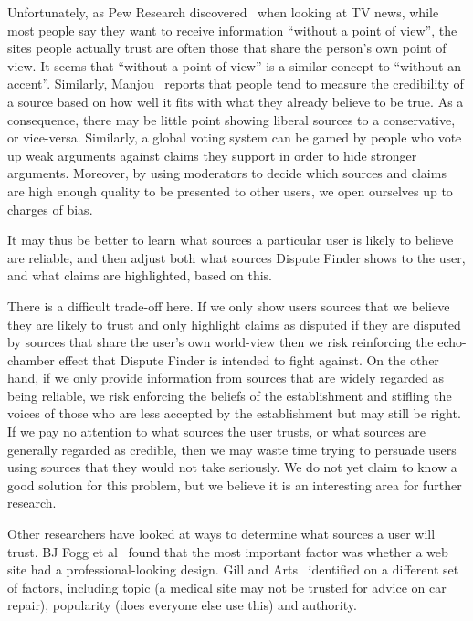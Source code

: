 \documentclass{www2010-submission}
\newcommand{\todo}[1]{}
\begin{document}
Unfortunately, as Pew Research discovered~\cite{PewResearch2008} when looking at TV news, while most people say they want to receive information ``without a point of view'', the sites people actually trust are often those that share the person's own point of view. It seems that ``without a point of view'' is a similar concept to ``without an accent''. Similarly, Manjou~\cite{Manjou2008} reports that people tend to measure the credibility of a source based on how well it fits with what they already believe to be true.  As a consequence, there may be little point showing liberal sources to a conservative, or vice-versa. Similarly, a global voting system can be gamed by people who vote up weak arguments against claims they support in order to hide stronger arguments. Moreover, by using moderators to decide which sources and claims are high enough quality to be presented to other users, we open ourselves up to charges of bias.

It may thus be better to learn what sources a particular user is likely to believe are reliable, and then adjust both what sources Dispute Finder shows to the user, and what claims are highlighted, based on this.

There is a difficult trade-off here. If we only show users sources that we believe they are likely to trust and only highlight claims as disputed if they are disputed by sources that share the user's own world-view then we risk reinforcing the echo-chamber effect that Dispute Finder is intended to fight against. On the other hand, if we only provide information from sources that are widely regarded as being reliable, we risk enforcing the beliefs of the establishment and stifling the voices of those who are less accepted by the establishment but may still be right. If we pay no attention to what sources the user trusts, or what sources are generally regarded as credible, then we may waste time trying to persuade users using sources that they would not take seriously. We do not yet claim to know a good solution for this problem, but we believe it is an interesting area for further research.

\todo{Cite Pew Research study saying people like to read news that supports their own point of view, but many others like neutral sources. http://people-press.org/report/?pageid=1353}

Other researchers have looked at ways to determine what sources a user will trust. 
BJ Fogg et al~\cite{Fogg2003} found that the most important factor was whether a web site had a professional-looking design. Gill and Arts~\cite{Gil2006} identified on a different set of factors, including topic (a medical site may not be trusted for advice on car repair), popularity (does everyone else use this) and authority.
\end{document}
